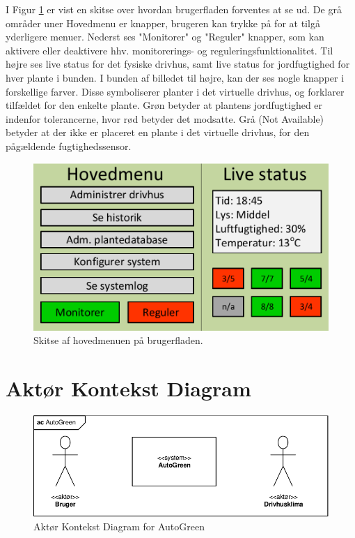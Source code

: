 I Figur \ref{fig:gui_skitse} er vist en skitse over hvordan brugerfladen forventes at se ud. De grå områder uner Hovedmenu er knapper, brugeren kan trykke på for at tilgå yderligere menuer. Nederst ses "Monitorer" og "Reguler" knapper, som kan aktivere eller deaktivere hhv. monitorerings- og reguleringsfunktionalitet. Til højre ses live status for det fysiske drivhus, samt live status for jordfugtighed for hver plante i bunden. I bunden af billedet til højre, kan der ses nogle knapper i forskellige farver. Disse symboliserer planter i det virtuelle drivhus, og forklarer tilfældet for den enkelte plante. Grøn betyder at plantens jordfugtighed er indenfor tolerancerne, hvor rød betyder det modsatte. Grå (Not Available) betyder at der ikke er placeret en plante i det virtuelle drivhus, for den pågældende fugtighedssensor. 

\begin{figure}[h]
\centering
\includegraphics[width=\textwidth - 3 cm]{../fig/gui_skitse}
\caption{Skitse af hovedmenuen på brugerfladen.}
\label{fig:gui_skitse}
\end{figure}

\clearpage

\section{Aktør Kontekst Diagram} 
\begin{figure}[h]
\centering 
\includegraphics[width={\textwidth}, trim=0 0 0 0, clip=true] {../fig/Aktoer_Kontekst_Diagram.pdf}
\caption{Aktør Kontekst Diagram for AutoGreen}
\label{fig:aktoer_kontekst_diagram}
\end{figure}

